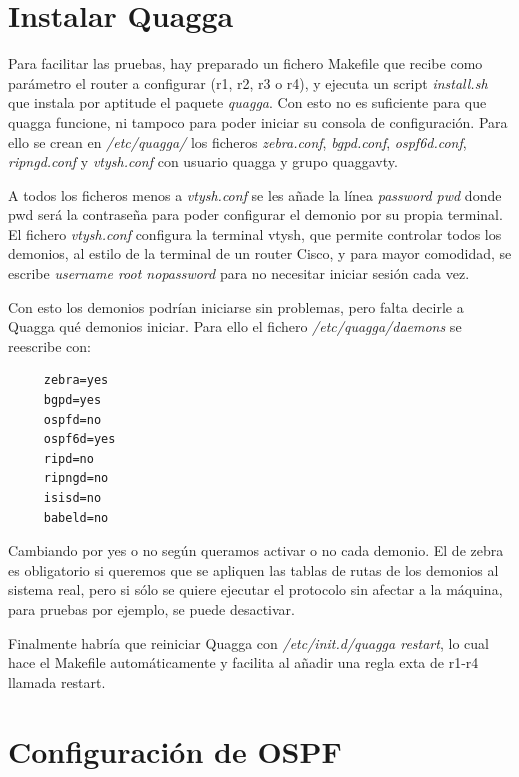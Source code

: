 \documentclass{article}
\begin{document}
\section{Instalar Quagga}


Para facilitar las pruebas, hay preparado un fichero Makefile que recibe como parámetro el router a configurar (r1, r2, r3 o r4), y ejecuta un script \textit{install.sh} que instala por aptitude el paquete \textit{quagga}.
 Con esto no es suficiente para que quagga funcione, ni tampoco para poder iniciar su consola de configuración. Para ello se crean en \textit{/etc/quagga/}
 los ficheros \textit{zebra.conf}, \textit{bgpd.conf}, \textit{ospf6d.conf}, \textit{ripngd.conf} y \textit{vtysh.conf} con usuario quagga y grupo quaggavty.

 A todos los ficheros menos a \textit{vtysh.conf} se les añade la línea \textit{password pwd} donde pwd será la contraseña para poder configurar el demonio por su propia terminal. El fichero \textit{vtysh.conf} configura la terminal vtysh, que permite controlar todos los demonios, al estilo de la terminal de un router Cisco, y para mayor comodidad, se escribe \textit{username root nopassword} para no necesitar iniciar sesión cada vez.

 Con esto los demonios podrían iniciarse sin problemas, pero falta decirle a Quagga qué demonios iniciar. Para ello el fichero \textit{/etc/quagga/daemons} se reescribe con:

 \begin{verbatim}
	 zebra=yes
	 bgpd=yes
	 ospfd=no
	 ospf6d=yes
	 ripd=no
	 ripngd=no
	 isisd=no
	 babeld=no
 \end{verbatim}

 Cambiando por yes o no según queramos activar o no cada demonio. El de zebra es obligatorio si queremos que se apliquen las tablas de rutas de los demonios al sistema real, pero si sólo se quiere ejecutar el protocolo sin afectar a la máquina, para pruebas por ejemplo, se puede desactivar.


 Finalmente habría que reiniciar Quagga con \textit{/etc/init.d/quagga restart}, lo cual hace el Makefile automáticamente y facilita al añadir una regla exta de r1-r4 llamada restart.

 

\section{Configuración de OSPF}
\end{document}
